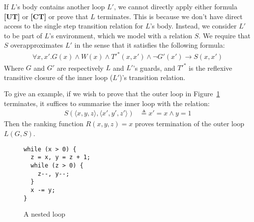 \documentclass[preprint]{sigplanconf}
\theoremstyle{definition}
\begin{document}
If $L$'s body contains another loop $L'$, we cannot directly apply either formula {\bf [UT]} or
{\bf [CT]} or prove that $L$ terminates.  This is because we don't have direct access to the
single step transition relation for $L$'s body.  Instead, we consider $L'$ to be part of
$L$'s environment, which we model with a relation $S$.  We require that $S$ overapproximates
$L'$ in the sense that it satisfies the following formula:
\begin{align*}
 \forall x, x'. G(x) \wedge W(x) \wedge T'^*(x, x') \wedge \lnot G'(x') \rightarrow S(x, x')
\end{align*}
Where $G$ and $G'$ are respectively $L$ and $L'$'s guards, and $T'^*$ is the reflexive transitive closure of
the inner loop ($L'$)'s transition relation.

To give an example, if we wish to prove that the outer loop in Figure~\ref{fig:nested} terminates,
it suffices to summarise the inner loop with the relation:
\begin{align*}
S(\langle x, y, z \rangle, \langle x', y', z' \rangle) & \triangleq x' = x \wedge y = 1
\end{align*}
Then the ranking function $R(x, y, z) = x$ proves termination of the outer loop $L(G, S)$.\\


\begin{figure}
\begin{lstlisting}
while (x > 0) {
  z = x, y = z + 1;
  while (z > 0) {
    z--, y--;
  }
  x -= y;
}
\end{lstlisting}
\caption{A nested loop\label{fig:nested}}
\end{figure}
\end{document}
